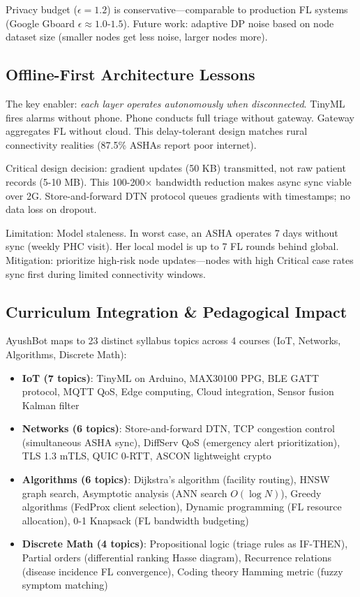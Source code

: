 \documentclass[conference,compsoc]{IEEEtran}
\begin{document}
Privacy budget (\(\epsilon=1.2\)) is conservative—comparable to production FL systems (Google Gboard \(\epsilon \approx 1.0\)-\(1.5\)). Future work: adaptive DP noise based on node dataset size (smaller nodes get less noise, larger nodes more).

\subsection{Offline-First Architecture Lessons}

The key enabler: \textit{each layer operates autonomously when disconnected}. TinyML fires alarms without phone. Phone conducts full triage without gateway. Gateway aggregates FL without cloud. This delay-tolerant design matches rural connectivity realities (87.5\% ASHAs report poor internet).

Critical design decision: gradient updates (50 KB) transmitted, not raw patient records (5-10 MB). This 100-200× bandwidth reduction makes async sync viable over 2G. Store-and-forward DTN protocol queues gradients with timestamps; no data loss on dropout.

Limitation: Model staleness. In worst case, an ASHA operates 7 days without sync (weekly PHC visit). Her local model is up to 7 FL rounds behind global. Mitigation: prioritize high-risk node updates—nodes with high Critical case rates sync first during limited connectivity windows.

\subsection{Curriculum Integration \& Pedagogical Impact}

AyushBot maps to 23 distinct syllabus topics across 4 courses (IoT, Networks, Algorithms, Discrete Math):

\begin{itemize}
    \item \textbf{IoT (7 topics)}: TinyML on Arduino, MAX30100 PPG, BLE GATT protocol, MQTT QoS, Edge computing, Cloud integration, Sensor fusion Kalman filter
    \item \textbf{Networks (6 topics)}: Store-and-forward DTN, TCP congestion control (simultaneous ASHA sync), DiffServ QoS (emergency alert prioritization), TLS 1.3 mTLS, QUIC 0-RTT, ASCON lightweight crypto
    \item \textbf{Algorithms (6 topics)}: Dijkstra's algorithm (facility routing), HNSW graph search, Asymptotic analysis (ANN search \(O(\log N)\)), Greedy algorithms (FedProx client selection), Dynamic programming (FL resource allocation), 0-1 Knapsack (FL bandwidth budgeting)
    \item \textbf{Discrete Math (4 topics)}: Propositional logic (triage rules as IF-THEN), Partial orders (differential ranking Hasse diagram), Recurrence relations (disease incidence FL convergence), Coding theory Hamming metric (fuzzy symptom matching)
\end{itemize}
\end{document}
